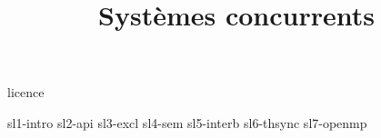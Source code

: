 \documentclass {beamer}
\title {Systèmes concurrents}
\begin{document}

 {licence}

 {sl1-intro}
 {sl2-api}
 {sl3-excl}
 {sl4-sem}
 {sl5-interb}
 {sl6-thsync}
 {sl7-openmp}
\end{document}
